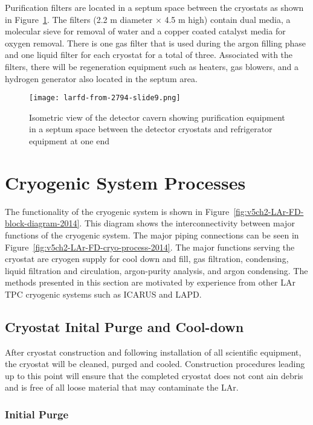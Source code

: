 Purification filters are located in a septum space between the cryostats as shown in Figure~\ref{fig:det-cavern-purif}. The filters (2.2 m
diameter $\times$ 4.5 m high) contain dual media, a molecular sieve for removal of water and a copper
coated catalyst media for oxygen removal. There is one gas filter that is used during the argon
filling phase and one liquid filter for each cryostat for a total of three. Associated with the
filters, there will be regeneration equipment such as heaters, gas blowers, and a hydrogen
generator also located in the septum area. 

\begin{figure}[htbp]
\centering
\texttt{[image: larfd-from-2794-slide9.png]} 
\caption{Isometric view of the detector cavern showing purification equipment in a septum
space between the detector cryostats and refrigerator equipment at one end}
\label{fig:det-cavern-purif}
\end{figure}


\section{Cryogenic System Processes}
\label{sec:cryo-crysys-proc}
The functionality of the cryogenic system is
shown in Figure~\ref{fig:v5ch2-LAr-FD-block-diagram-2014}. This diagram shows
the interconnectivity between major functions of the cryogenic system. The major piping
connections can be seen in Figure~\ref{fig:v5ch2-LAr-FD-cryo-process-2014}. The major functions serving the
cryostat are cryogen supply for cool down and fill, gas
filtration, condensing, liquid filtration and circulation, argon-purity analysis, and argon condensing. The methods presented in this section are motivated by
experience from other LAr TPC cryogenic systems such as ICARUS and LAPD.

\subsection{Cryostat Inital Purge and Cool-down}

After cryostat construction and following installation of all scientific equipment, the cryostat
will be cleaned, purged and cooled. Construction procedures leading up to this point will
ensure that the completed cryostat does not cont ain debris and is free of all loose material that may contaminate the LAr.

\subsubsection{Initial Purge}


